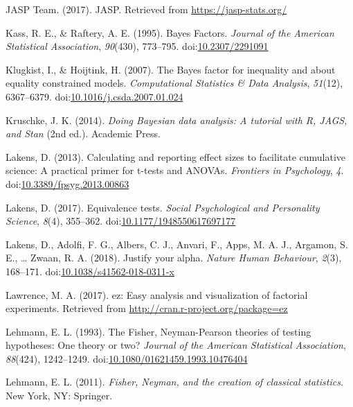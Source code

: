\documentclass[english,mask,man]{apa6}
\theoremstyle{definition}
\theoremstyle{definition}
\theoremstyle{definition}
\theoremstyle{remark}
\begin{document}
\hypertarget{ref-JASPTeam2017}{}
JASP Team. (2017). JASP. Retrieved from \url{https://jasp-stats.org/}

\hypertarget{ref-Kass1995a}{}
Kass, R. E., \& Raftery, A. E. (1995). Bayes Factors. \emph{Journal of
the American Statistical Association}, \emph{90}(430), 773--795.
doi:\href{https://doi.org/10.2307/2291091}{10.2307/2291091}

\hypertarget{ref-Klugkist2007}{}
Klugkist, I., \& Hoijtink, H. (2007). The Bayes factor for inequality
and about equality constrained models. \emph{Computational Statistics \&
Data Analysis}, \emph{51}(12), 6367--6379.
doi:\href{https://doi.org/10.1016/j.csda.2007.01.024}{10.1016/j.csda.2007.01.024}

\hypertarget{ref-Kruschke2014}{}
Kruschke, J. K. (2014). \emph{Doing Bayesian data analysis: A tutorial
with R, JAGS, and Stan} (2nd ed.). Academic Press.

\hypertarget{ref-Lakens2013}{}
Lakens, D. (2013). Calculating and reporting effect sizes to facilitate
cumulative science: A practical primer for t-tests and ANOVAs.
\emph{Frontiers in Psychology}, \emph{4}.
doi:\href{https://doi.org/10.3389/fpsyg.2013.00863}{10.3389/fpsyg.2013.00863}

\hypertarget{ref-Lakens2017a}{}
Lakens, D. (2017). Equivalence tests. \emph{Social Psychological and
Personality Science}, \emph{8}(4), 355--362.
doi:\href{https://doi.org/10.1177/1948550617697177}{10.1177/1948550617697177}

\hypertarget{ref-Lakens2017}{}
Lakens, D., Adolfi, F. G., Albers, C. J., Anvari, F., Apps, M. A. J.,
Argamon, S. E., \ldots{} Zwaan, R. A. (2018). Justify your alpha.
\emph{Nature Human Behaviour}, \emph{2}(3), 168--171.
doi:\href{https://doi.org/10.1038/s41562-018-0311-x}{10.1038/s41562-018-0311-x}

\hypertarget{ref-Lawrence2017}{}
Lawrence, M. A. (2017). ez: Easy analysis and visualization of factorial
experiments. Retrieved from \url{http://cran.r-project.org/package=ez}

\hypertarget{ref-Lehmann1993}{}
Lehmann, E. L. (1993). The Fisher, Neyman-Pearson theories of testing
hypotheses: One theory or two? \emph{Journal of the American Statistical
Association}, \emph{88}(424), 1242--1249.
doi:\href{https://doi.org/10.1080/01621459.1993.10476404}{10.1080/01621459.1993.10476404}

\hypertarget{ref-Lehmann2011}{}
Lehmann, E. L. (2011). \emph{Fisher, Neyman, and the creation of
classical statistics}. New York, NY: Springer.
\end{document}
